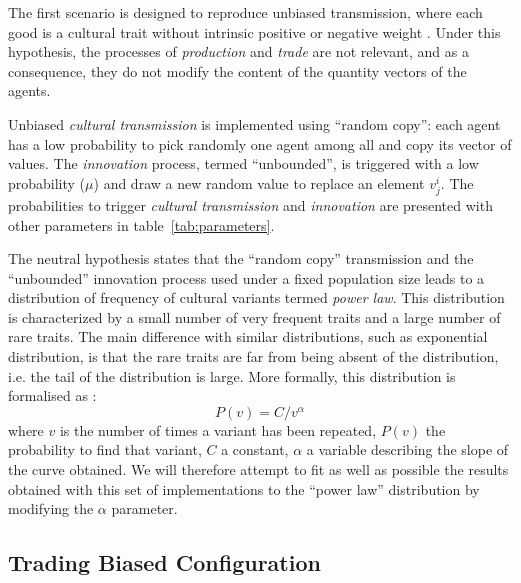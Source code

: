\documentclass{wscpaperproc}
\begin{document}
The first scenario is designed to reproduce unbiased transmission, where each good is a cultural trait without intrinsic positive or negative weight \cite{bentley_random_2004,bentley_specialisation_2005,mesoudi_random_2009}. 
Under this hypothesis, the processes of \emph{production} and \emph{trade} are not relevant, and as a consequence, they do not modify the content of the quantity vectors of the agents.

Unbiased \emph{cultural transmission} is implemented using ``random copy'': each agent has a low probability to pick randomly one agent among all and copy its vector of values. The \emph{innovation} process, termed ``unbounded'', is triggered with a low probability ($\mu$) and draw a new random value to replace an element $v^i_j$. The probabilities to trigger \emph{cultural transmission} and \emph{innovation} are presented with other parameters in table~\ref{tab:parameters}.

The neutral hypothesis states that the ``random copy'' transmission and the ``unbounded'' innovation process used under a fixed population size leads to a distribution of frequency of cultural variants termed \emph{power law}. This distribution is characterized by a small number of very frequent traits and a large number of rare traits. The main difference with similar distributions, such as exponential distribution, is that the rare traits are far from being absent of the distribution, i.e. the tail of the distribution is large.
More formally, this distribution is formalised as : $$P(v)=C/v^\alpha $$ where $v$ is the number of times a variant has been repeated, $P(v)$ the probability to find that variant, $C$ a constant, $\alpha$ a variable describing the slope of the curve obtained. We will therefore attempt to fit as well as possible the results obtained with this set of implementations to the ``power law'' distribution by modifying the $\alpha$ parameter.

\subsection{Trading Biased Configuration}\label{sec:trade}
\end{document}
